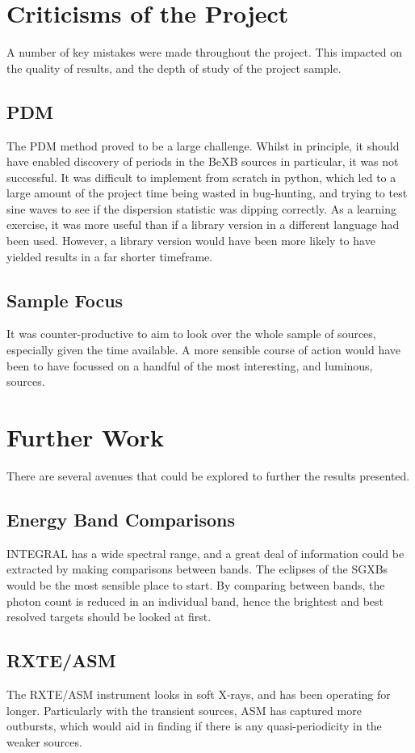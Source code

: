 \section{Criticisms of the Project}
A number of key mistakes were made throughout the project. This impacted on the quality of results, and the depth of study of the project sample. 

\subsection{PDM}
The PDM method proved to be a large challenge. Whilst in principle, it should have enabled discovery of periods in the BeXB sources in particular, it was not successful. It was difficult to implement from scratch in python, which led to a large amount of the project time being wasted in bug-hunting, and trying to test sine waves to see if the dispersion statistic was dipping correctly. As a learning exercise, it was more useful than if a library version in a different language had been used. However, a library version would have been more likely to have yielded results in a far shorter timeframe. 

\subsection{Sample Focus}
It was counter-productive to aim to look over the whole sample of sources, especially given the time available. A more sensible course of action would have been to have focussed on a handful of the most interesting, and luminous, sources. 


\section{Further Work}
There are several avenues that could be explored to further the results presented. 

\subsection{Energy Band Comparisons}
INTEGRAL has a wide spectral range, and a great deal of information could be extracted by making comparisons between bands. The eclipses of the SGXBs would be the most sensible place to start. By comparing between bands, the photon count is reduced in an individual band, hence the brightest and best resolved targets should be looked at first.

\subsection{RXTE/ASM}
The RXTE/ASM instrument looks in soft X-rays, and has been operating for longer. Particularly with the transient sources, ASM has captured more outbursts, which would aid in finding if there is any quasi-periodicity in the weaker sources. 


